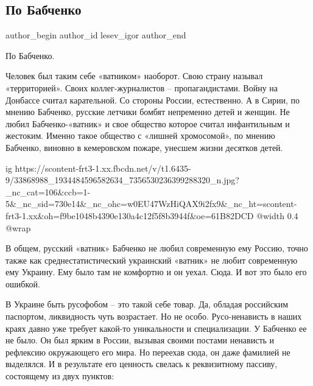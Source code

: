  
 
 
 
 
 
\subsection{По Бабченко}
\label{sec:30_05_2018.fb.lesev_igor.1.babchenko}
 
\ifcmt
 author_begin
   author_id lesev_igor
 author_end
\fi

По Бабченко.

Человек был таким себе «ватником» наоборот. Свою страну называл «территорией».
Своих коллег-журналистов – пропагандистами. Войну на Донбассе считал
карательной. Со стороны России, естественно. А в Сирии, по мнению Бабченко,
русские летчики бомбят непременно детей и женщин. Не любил Бабченко-«ватник» и
свое общество которое считал инфантильным и жестоким. Именно такое общество с
«лишней хромосомой», по мнению Бабченко, виновно в кемеровском пожаре, унесшем
жизни десятков детей.

\ifcmt
  ig https://scontent-frt3-1.xx.fbcdn.net/v/t1.6435-9/33868988_1934484596582634_7356530236399288320_n.jpg?_nc_cat=106&ccb=1-5&_nc_sid=730e14&_nc_ohc=w0EU47WzHiQAX9i2fx9&_nc_ht=scontent-frt3-1.xx&oh=f9be1048b4390e130a4c12f5f8b3944f&oe=61B82DCD
  @width 0.4
  @wrap 
\fi

В общем, русский «ватник» Бабченко не любил современную ему Россию, точно также
как среднестатистический украинский «ватник» не любит современную ему Украину.
Ему было там не комфортно и он уехал. Сюда. И вот это было его ошибкой.

В Украине быть русофобом – это такой себе товар. Да, обладая российским
паспортом, ликвидность чуть возрастает. Но не особо. Русо-ненависть в наших
краях давно уже требует какой-то уникальности и специализации. У Бабченко ее не
было. Он был ярким в России, вызывая своими постами ненависть и рефлексию
окружающего его мира. Но переехав сюда, он даже фамилией не выделялся. И в
результате его ценность свелась к реквизитному пассиву, состоящему из двух
пунктов:

